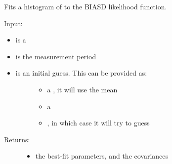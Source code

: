 \documentclass[letterpaper,10pt,english]{sphinxmanual}
\begin{document}
\begin{fulllineitems}
\label{code_utils:utils.fit_histogram.fit}
Fits a histogram of to the BIASD likelihood function.

Input:
\begin{itemize}
\item {} 
 is a 

\item {} 
 is the measurement period

\item {} \begin{description}
\item[{ is an initial guess. This can be provided as:}] \leavevmode\begin{itemize}
\item {} 
a , it will use the mean

\item {} 
a 

\item {} 
, in which case it will try to guess

\end{itemize}

\end{description}

\end{itemize}
\begin{description}
\item[{Returns:}] \leavevmode\begin{itemize}
\item {} 
the best-fit parameters, and the covariances

\end{itemize}

\end{description}

\end{fulllineitems}

\end{document}
